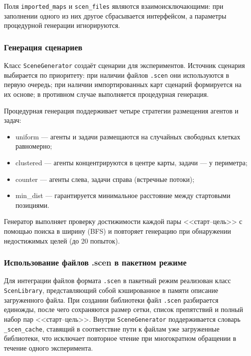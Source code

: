 Поля \texttt{imported\_maps} и \texttt{scen\_files} являются взаимоисключающими: при заполнении одного из них другое сбрасывается интерфейсом, а параметры процедурной генерации игнорируются.

\subsubsection{Генерация сценариев}

Класс \texttt{SceneGenerator} создаёт сценарии для экспериментов. Источник сценария выбирается по приоритету: при наличии файлов \texttt{.scen} они используются в первую очередь; при наличии импортированных карт сценарий формируется на их основе; в противном случае выполняется процедурная генерация.

Процедурная генерация поддерживает четыре стратегии размещения агентов и задач:

\begin{itemize}
    \item uniform --- агенты и задачи размещаются на случайных свободных клетках равномерно;
    \item clustered --- агенты концентрируются в центре карты, задачи --- у периметра;
    \item counter --- агенты слева, задачи справа (встречные потоки);
    \item min\_dist --- гарантируется минимальное расстояние между стартовыми позициями.
\end{itemize}

Генератор выполняет проверку достижимости каждой пары <<старт--цель>> с помощью поиска в ширину (BFS) и повторяет генерацию при обнаружении недостижимых целей (до 20 попыток).

\subsubsection{Использование файлов .scen в пакетном режиме}

Для интеграции файлов формата \texttt{.scen} в пакетный режим реализован класс \texttt{ScenLibrary}, представляющий собой кэшированное в памяти описание загруженного файла. При создании библиотеки файл \texttt{.scen} разбирается единожды, после чего сохраняются размер сетки, список препятствий и полный набор пар <<старт--цель>>. Внутри \texttt{SceneGenerator} поддерживается словарь \texttt{\_scen\_cache}, ставящий в соответствие пути к файлам уже загруженные библиотеки, что исключает повторное чтение при многократном обращении в течение одного эксперимента.

